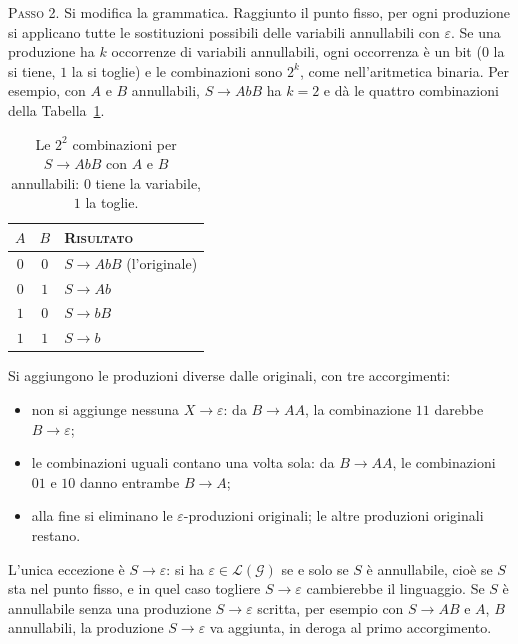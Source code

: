 \documentclass[a4paper, 11pt, oneside]{book}
\theoremstyle{formale}
\begin{document}
    \textsc{Passo 2}. Si modifica la grammatica. Raggiunto il punto fisso, per ogni
    produzione si applicano tutte le sostituzioni possibili delle variabili annullabili
    con $\varepsilon$. Se una produzione ha $k$ occorrenze di variabili annullabili, ogni
    occorrenza \`e un bit ($0$ la si tiene, $1$ la si toglie) e le combinazioni sono
    $2^k$, come nell'aritmetica binaria. Per esempio, con $A$ e $B$ annullabili,
    $S \to AbB$ ha $k = 2$ e d\`a le quattro combinazioni della
    Tabella~\ref{tab:combinazioni}.
    \begin{table}[H]
        \centering
        \begin{tabular}{ccl}
            \toprule
            $A$ & $B$ & \textsc{Risultato} \\
            \midrule
            $0$ & $0$ & $S \to AbB$ (l'originale) \\
            $0$ & $1$ & $S \to Ab$ \\
            $1$ & $0$ & $S \to bB$ \\
            $1$ & $1$ & $S \to b$ \\
            \bottomrule
        \end{tabular}
        \caption{Le $2^2$ combinazioni per $S \to AbB$ con $A$ e $B$ annullabili: $0$
            tiene la variabile, $1$ la toglie.}
        \label{tab:combinazioni}
    \end{table}
    \noindent Si aggiungono le produzioni diverse dalle originali, con tre accorgimenti:
    \begin{itemize}
        \item non si aggiunge nessuna $X \to \varepsilon$: da $B \to AA$, la
            combinazione $11$ darebbe $B \to \varepsilon$;
        \item le combinazioni uguali contano una volta sola: da $B \to AA$, le
            combinazioni $01$ e $10$ danno entrambe $B \to A$;
        \item alla fine si eliminano le $\varepsilon$-produzioni originali; le altre
            produzioni originali restano.
    \end{itemize}

    L'unica eccezione \`e $S \to \varepsilon$: si ha
    $\varepsilon \in \mathcal{L}(\mathcal{G})$ se e solo se $S$ \`e annullabile, cio\`e
    se $S$ sta nel punto fisso, e in quel caso togliere $S \to \varepsilon$ cambierebbe
    il linguaggio. Se $S$ \`e annullabile senza una produzione $S \to \varepsilon$
    scritta, per esempio con $S \to AB$ e $A$, $B$ annullabili, la produzione
    $S \to \varepsilon$ va aggiunta, in deroga al primo accorgimento.
\end{document}
